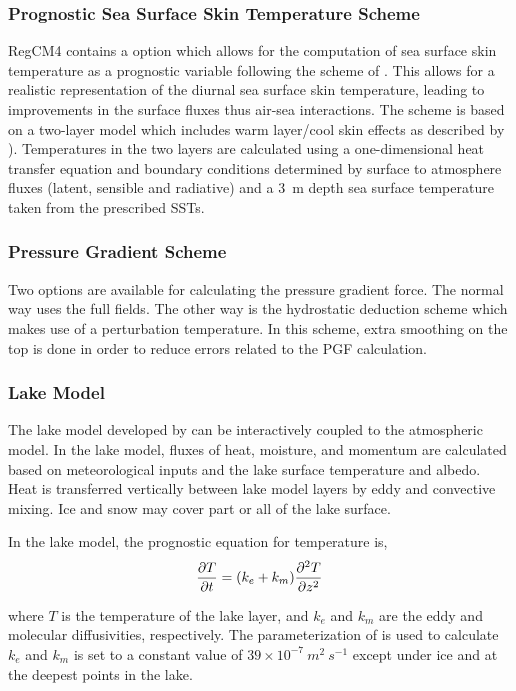 \subsubsection{Prognostic Sea Surface Skin Temperature Scheme} RegCM4 contains a
option which allows for the computation of sea surface skin temperature as a
prognostic variable following the scheme of \cite{Zeng_05}.  This allows for a
realistic representation of the diurnal sea surface skin temperature, leading to
improvements in the surface fluxes thus air-sea interactions.  The scheme is
based on a two-layer model which includes warm layer/cool skin effects as
described by \cite{Fairall_96}).  Temperatures in the two layers are calculated
using a one-dimensional heat transfer equation and boundary conditions
determined by surface to atmosphere fluxes (latent, sensible and radiative) and
a 3~m depth sea surface temperature taken from the prescribed SSTs. 


\subsubsection{Pressure Gradient Scheme} Two options are available for
calculating the pressure gradient force.  The normal way uses the full fields.
The other way is the hydrostatic deduction scheme which makes use of a
perturbation temperature.  In this scheme, extra smoothing on the top is done in
order to reduce errors related to the PGF calculation. 

\subsubsection{Lake Model} The lake model developed by  \cite{Hostetler_93} can
be interactively coupled to the atmospheric model.  In the lake model, fluxes of
heat, moisture, and momentum are calculated based on meteorological inputs and
the lake surface temperature and albedo.  Heat is transferred vertically between
lake model layers by eddy and convective mixing.  Ice and snow may cover part or
all of the lake surface.

In the lake model, the prognostic equation for temperature is, \begin{eqnarray}
{\partial{T} \over \partial{t}} = (k_e + k_m) {\partial^2{T} \over \partial{z}^2
} \end{eqnarray}

\noindent where $T$ is the temperature of the lake layer, and $k_e$ and $k_m$
are the eddy and molecular diffusivities, respectively.   The parameterization
of \cite{Henderson-Sellers_86} is used to calculate $k_e$ and $k_m$ is set to a
constant value of $39 \times 10^{-7}~m^2~s^{-1}$ except under ice and at the
deepest points in the lake.

